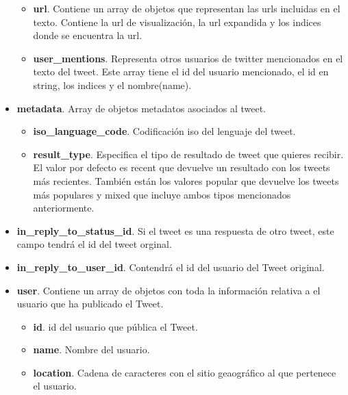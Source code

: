 \begin{itemize}
\begin{itemize}
\item  \textbf{url}. Contiene un array de objetos que representan las urls incluidas en el texto. Contiene la url de visualización, la url expandida y los indices donde se encuentra la url.

\item \textbf{user\_mentions}. Representa otros usuarios de twitter mencionados en el texto del tweet. Este array tiene el id del usuario mencionado, el id en string, los indices y el nombre(name).

\end{itemize}


\item \textbf{metadata}. Array de objetos metadatos asociados al tweet.

\begin{itemize}

\item \textbf{iso\_language\_code}. Codificación iso del lenguaje del tweet.

\item \textbf{result\_type}. Especifica el tipo de resultado de tweet que quieres recibir. El valor por defecto es recent que devuelve un resultado con los tweets más recientes. También están los valores popular que devuelve los tweets más populares y mixed que incluye ambos tipos mencionados anteriormente.

\end{itemize}


\item \textbf{in\_reply\_to\_status\_id}. Si el tweet es una respuesta de otro tweet, este campo tendrá el id del tweet orginal.

\item \textbf{in\_reply\_to\_user\_id}. Contendrá el id del usuario del Tweet original.

\item \textbf{user}. Contiene un array de objetos con toda la información relativa a el usuario que ha publicado el Tweet.

\begin{itemize}

\item \textbf{id}. id del usuario que pública el Tweet.

\item \textbf{name}. Nombre del usuario.

\item \textbf{location}. Cadena de caracteres con el sitio geaográfico al que pertenece el usuario.


\end{itemize}
\end{itemize}
